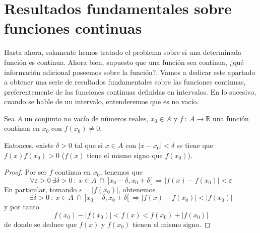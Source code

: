 
\newpage

\section{Resultados fundamentales sobre funciones continuas}
Hasta ahora, solamente hemos tratado el problema sobre si una determinada función es continua. Ahora bien, supuesto que una función sea continua, ¿qué información adicional poseemos sobre la función?. Vamos a dedicar este apartado a obtener una serie de resultados fundamentales sobre las funciones continuas, preferentemente de las funciones continuas definidas en intervalos. En lo sucesivo, cuando se hable de un intervalo, entenderemos que es no vacío.

\begin{prop}
    Sea $A$ un conjunto no vacío de números reales, $x_0 \in A$ y $f ~:~ A \longrightarrow \mathbb{R}$ una función
    continua en $x_0$ con $f(x_0) \neq 0$.
    
    Entonces, existe $\delta > 0$ tal que si $x \in A$ con $|x-x_0| < \delta$ se tiene que $f(x) f(x_0) > 0$ ($f(x)$ tiene el mismo signo que $f(x_0)$).
\end{prop}
\begin{proof}
    Por ser $f$ continua en $x_0$, tenemos que
    \begin{equation*}
        \forall \varepsilon > 0 ~ \exists \delta > 0 ~:~ x \in A ~ \cap ~ ]x_0-\delta,x_0+\delta[ ~ \Longrightarrow |f(x)-f(x_0)| < \varepsilon
    \end{equation*}
    En particular, tomando $\varepsilon = |f(x_0)|$, obtenemos
    \begin{equation*}
        \exists \delta > 0 ~:~ x \in A ~ \cap ~ ]x_0-\delta,x_0+\delta[ ~ \Longrightarrow |f(x)-f(x_0)| < |f(x_0)|
    \end{equation*}
    y por tanto
    \begin{equation*}
        f(x_0) - |f(x_0)| < f(x) < f(x_0) + |f(x_0)|
    \end{equation*}
    de donde se deduce que $f(x)$ y $f(x_0)$ tienen el mismo signo.
\end{proof}

